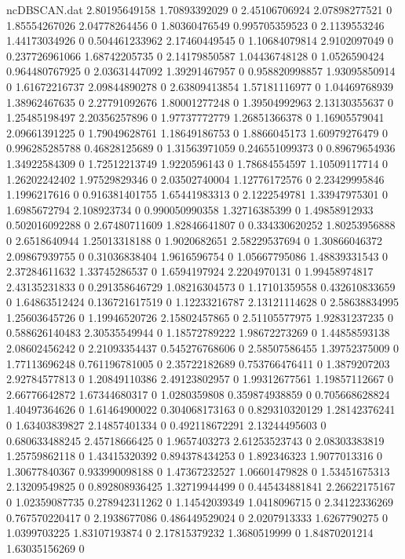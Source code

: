 \begin{filecontents}{ncDBSCAN.dat}
2.80195649158 1.70893392029 0
2.45106706924 2.07898277521 0
1.85554267026 2.04778264456 0
1.80360476549 0.995705359523 0
2.1139553246 1.44173034926 0
0.504461233962 2.17460449545 0
1.10684079814 2.9102097049 0
0.237726961066 1.68742205735 0
2.14179850587 1.04436748128 0
1.0526590424 0.964480767925 0
2.03631447092 1.39291467957 0
0.958820998857 1.93095850914 0
1.61672216737 2.09844890278 0
2.63809413854 1.57181116977 0
1.04469768939 1.38962467635 0
2.27791092676 1.80001277248 0
1.39504992963 2.13130355637 0
1.25485198497 2.20356257896 0
1.97737772779 1.26851366378 0
1.16905579041 2.09661391225 0
1.79049628761 1.18649186753 0
1.8866045173 1.60979276479 0
0.996285285788 0.46828125689 0
1.31563971059 0.246551099373 0
0.89679654936 1.34922584309 0
1.72512213749 1.9220596143 0
1.78684554597 1.10509117714 0
1.26202242402 1.97529829346 0
2.03502740004 1.12776172576 0
2.23429995846 1.1996217616 0
0.916381401755 1.65441983313 0
2.1222549781 1.33947975301 0
1.6985672794 2.108923734 0
0.990050990358 1.32716385399 0
1.49858912933 0.502016092288 0
2.67480711609 1.82846641807 0
0.334330620252 1.80253956888 0
2.6518640944 1.25013318188 0
1.9020682651 2.58229537694 0
1.30866046372 2.09867939755 0
0.31036838404 1.9616596754 0
1.05667795086 1.48839331543 0
2.37284611632 1.33745286537 0
1.6594197924 2.2204970131 0
1.99458974817 2.43135231833 0
0.291358646729 1.08216304573 0
1.17101359558 0.432610833659 0
1.64863512424 0.136721617519 0
1.12233216787 2.13121114628 0
2.58638834995 1.25603645726 0
1.19946520726 2.15802457865 0
2.51105577975 1.92831237235 0
0.588626140483 2.30535549944 0
1.18572789222 1.98672273269 0
1.44858593138 2.08602456242 0
2.21093354437 0.545276768606 0
2.58507586455 1.39752375009 0
1.77113696248 0.761196781005 0
2.35722182689 0.753766476411 0
1.3879207203 2.92784577813 0
1.20849110386 2.49123802957 0
1.99312677561 1.19857112667 0
2.66776642872 1.67344680317 0
1.0280359808 0.359874938859 0
0.705668628824 1.40497364626 0
1.61464900022 0.304068173163 0
0.829310320129 1.28142376241 0
1.63403839827 2.14857401334 0
0.492118672291 2.13244495603 0
0.680633488245 2.45718666425 0
1.9657403273 2.61253523743 0
2.08303383819 1.25759862118 0
1.43415320392 0.894378434253 0
1.892346323 1.9077013316 0
1.30677840367 0.933990098188 0
1.47367232527 1.06601479828 0
1.53451675313 2.13209549825 0
0.892808936425 1.32719944499 0
0.445434881841 2.26622175167 0
1.02359087735 0.278942311262 0
1.14542039349 1.0418096715 0
2.34122336269 0.767570220417 0
2.1938677086 0.486449529024 0
2.0207913333 1.6267790275 0
1.0399703225 1.83107193874 0
2.17815379232 1.3680519999 0
1.84870201214 1.63035156269 0

\end{filecontents}
